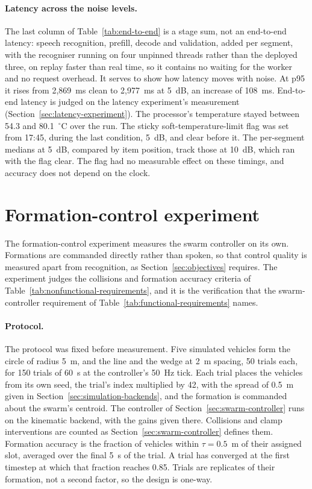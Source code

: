 \paragraph{Latency across the noise levels.} The last column of Table~\ref{tab:end-to-end} is a
stage sum, not an end-to-end latency: speech recognition, prefill, decode and validation, added per
segment, with the recogniser running on four unpinned threads rather than the deployed three, on
replay faster than real time, so it contains no waiting for the worker and no request overhead. It serves to show how latency moves with noise. At p95 it rises from 2{,}869~ms clean to
2{,}977~ms at 5~dB, an increase of 108~ms. End-to-end latency is judged on the latency experiment's
measurement (Section~\ref{sec:latency-experiment}). The processor's temperature stayed between 54.3
and 80.1~$^{\circ}$C over the run. The sticky soft-temperature-limit flag was set from 17:45, during
the last condition, 5~dB, and clear before it. The per-segment medians at 5~dB, compared by item
position, track those at 10~dB, which ran with the flag clear. The flag had no measurable effect on
these timings, and accuracy does not depend on the clock.

\section{Formation-control experiment}
\label{sec:formation-control}
The formation-control experiment measures the swarm controller on its own. Formations are
commanded directly rather than spoken, so that control quality is measured apart from recognition,
as Section~\ref{sec:objectives} requires. The experiment judges the collisions and formation
accuracy criteria of Table~\ref{tab:nonfunctional-requirements}, and it is the verification that
the swarm-controller requirement of Table~\ref{tab:functional-requirements} names.

\paragraph{Protocol.} The protocol was fixed before measurement. Five simulated vehicles form the
circle of radius 5~m, and the line and the wedge at 2~m spacing, 50 trials each, for 150 trials of
60~s at the controller's 50~Hz tick. Each trial places the vehicles from its own seed, the trial's
index multiplied by 42, with the spread of 0.5~m given in Section~\ref{sec:simulation-backends},
and the formation is commanded about the swarm's centroid. The controller of Section~\ref{sec:swarm-controller} runs on the
kinematic backend, with the gains given there. Collisions and clamp interventions are counted as
Section~\ref{sec:swarm-controller} defines them. Formation accuracy is the fraction of vehicles
within $\tau = 0.5$~m of their assigned slot, averaged over the final 5~s of the trial. A trial
has converged at the first timestep at which that fraction reaches 0.85. Trials are replicates of
their formation, not a second factor, so the design is one-way.

